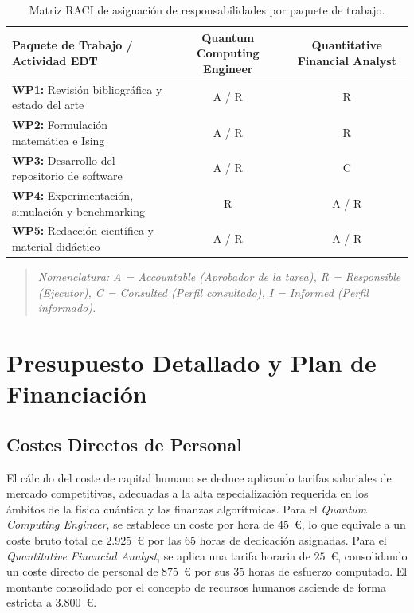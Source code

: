 \begin{table}[htbp]
    \centering
    \caption{Matriz RACI de asignación de responsabilidades por paquete de trabajo.}
    \label{tab:matriz_raci}
    \begin{tabular}{lcc}
        \toprule
        \textbf{Paquete de Trabajo / Actividad EDT} & \textbf{Quantum Computing Engineer} & \textbf{Quantitative Financial Analyst} \\
        \midrule
        \textbf{WP1:} Revisión bibliográfica y estado del arte & A / R & R \\
        \textbf{WP2:} Formulación matemática e Ising & A / R & R \\
        \textbf{WP3:} Desarrollo del repositorio de software & A / R & C \\
        \textbf{WP4:} Experimentación, simulación y benchmarking & R & A / R \\
        \textbf{WP5:} Redacción científica y material didáctico & A / R & A / R \\
        \bottomrule
    \end{tabular}
    \begin{quote}
        \footnotesize \textit{Nomenclatura: A = Accountable (Aprobador de la tarea), R = Responsible (Ejecutor), C = Consulted (Perfil consultado), I = Informed (Perfil informado).}
    \end{quote}
\end{table}

\section{Presupuesto Detallado y Plan de Financiación}
\label{sec:presupuesto_plan_financiacion}

\subsection{Costes Directos de Personal}
El cálculo del coste de capital humano se deduce aplicando tarifas salariales de mercado competitivas, adecuadas a la alta especialización requerida en los ámbitos de la física cuántica y las finanzas algorítmicas. Para el \textit{Quantum Computing Engineer}, se establece un coste por hora de $45$~\euro{}, lo que equivale a un coste bruto total de $2.925$~\euro{} por las $65$ horas de dedicación asignadas. Para el \textit{Quantitative Financial Analyst}, se aplica una tarifa horaria de $25$~\euro{}, consolidando un coste directo de personal de $875$~\euro{} por sus $35$ horas de esfuerzo computado. El montante consolidado por el concepto de recursos humanos asciende de forma estricta a $3.800$~\euro{}.

